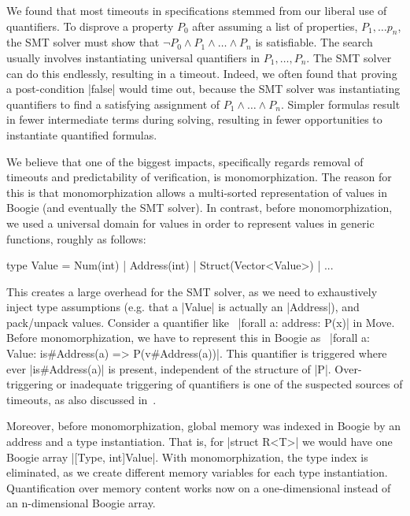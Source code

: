 We found that most timeouts in specifications stemmed from our liberal
use of quantifiers.  To disprove a property $P_0$ after assuming a
list of properties, $P_1, \ldots p_n$, the SMT solver must show that
$\neg P_0 \wedge P_1 \wedge \ldots \wedge P_n$ is satisfiable.  The
search usually involves instantiating universal quantifiers in $P_1,
\ldots, P_n$.  The SMT solver can do this endlessly, resulting in a
timeout. Indeed, we often found that proving a post-condition |false|
would time out, because the SMT solver was instantiating quantifiers
to find a satisfying assignment of $P_1 \wedge \ldots \wedge P_n$.
Simpler formulas result in fewer intermediate terms during solving,
resulting in fewer opportunities to instantiate quantified formulas.


We believe that one of the biggest impacts, specifically regards
removal of timeouts and predictability of verification, is monomorphization. The
reason for this is that monomorphization allows a multi-sorted representation
of values in Boogie (and eventually the SMT solver). In contrast, before
monomorphization, we used a universal domain for values in order to represent
values in generic functions, roughly as follows:

\begin{Move}
  type Value = Num(int) | Address(int) | Struct(Vector<Value>) | ...
\end{Move}

\noindent This creates a large overhead for the SMT solver, as we need to
exhaustively inject type assumptions (e.g. that a |Value| is actually an
|Address|), and pack/unpack values. Consider a quantifier like~%
|forall a: address: P(x)| in Move. Before monomorphization, we have to represent
this in Boogie as~%
|forall a: Value: is#Address(a) => P(v#Address(a))|. This quantifier is
triggered where ever |is#Address(a)| is present, independent of the structure of
|P|. Over-triggering or inadequate triggering of quantifiers is one of the
suspected sources of timeouts, as also discussed in~\cite{BUTTERFLY}.

Moreover, before monomorphization, global memory was indexed in Boogie by an
address and a type instantiation. That is, for |struct R<T>| we would
have one Boogie array |[Type, int]Value|. With monomorphization, the type index
is eliminated, as we create different memory variables for each type
instantiation.  Quantification over memory content works now on a one-dimensional
instead of an n-dimensional Boogie array.

